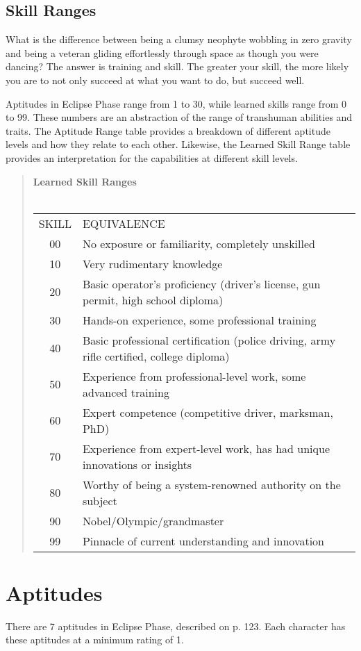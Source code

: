 \subsection{Skill Ranges}
What is the difference between being a clumsy neophyte wobbling in zero gravity and being a veteran
gliding effortlessly through space as though you were
dancing? The answer is training and skill. The greater
your skill, the more likely you are to not only succeed
at what you want to do, but succeed well.

 Aptitudes in Eclipse Phase range from 1 to 30,
while learned skills range from 0 to 99. These numbers are an abstraction of the range of transhuman
abilities and traits. The Aptitude Range table provides
a breakdown of different aptitude levels and how they
relate to each other. Likewise, the Learned Skill Range
table provides an interpretation for the capabilities at
different skill levels.


\begin{quotation}
\textbf{Learned Skill Ranges}
\\
\\
\begin{tabular}{cl}
SKILL & EQUIVALENCE \\
00 & No exposure or familiarity, completely unskilled \\
10 & Very rudimentary knowledge \\
20 & Basic operator’s proficiency (driver’s license, gun permit, high school diploma) \\
30 & Hands-on experience, some professional training \\
40 & Basic professional certification (police driving, army rifle certified, college diploma) \\
50 & Experience from professional-level work, some advanced training \\
60 & Expert competence (competitive driver, marksman, PhD) \\
70 & Experience from expert-level work, has had unique innovations or insights \\
80 & Worthy of being a system-renowned authority on the subject \\
90 & Nobel/Olympic/grandmaster \\
99 & Pinnacle of current understanding and innovation \\
\end{tabular}
\end{quotation}


\section{Aptitudes}
There are 7 aptitudes in Eclipse Phase, described on p.
123. Each character has these aptitudes at a minimum
rating of 1.

